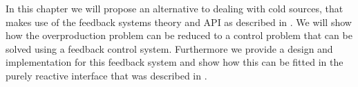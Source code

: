 In this chapter we will propose an alternative to dealing with cold sources, that makes use of the feedback systems theory and API as described in . We will show how the overproduction problem can be reduced to a control problem that can be solved using a feedback control system. Furthermore we provide a design and implementation for this feedback system and show how this can be fitted in the purely reactive interface that was described in .










